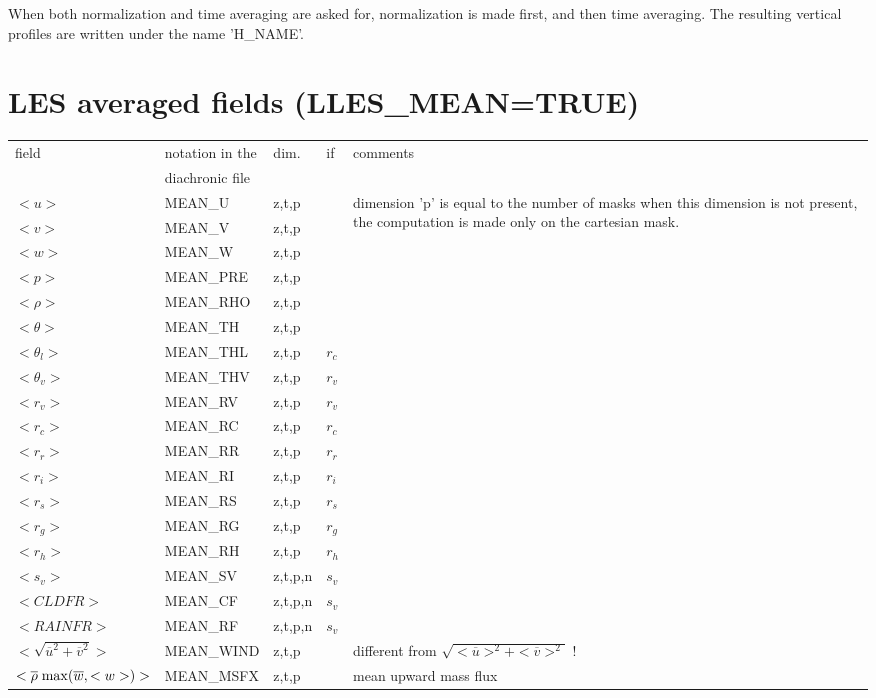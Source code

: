 When both normalization and time averaging are asked for,
normalization is made first, and then time averaging. The resulting
vertical profiles are written under the name 'H\_NAME'.\\

\section{LES averaged fields (LLES\_MEAN=TRUE)}


\begin{center}
\begin{makeimage}
\begin{tabular}{||p{6cm}|>{\centering}p{2.5cm}|>{\centering}p{1.5cm}|>{\centering}p{0.5cm}|p{5cm }||}
\hline
\hline
field & notation in the & dim. &   if  & comments \\
      & diachronic file & &  & \\
\hline
\hline
$<u>$ & MEAN\_U & z,t,p & &\multirow{15}{5cm}{dimension 'p' is equal to the  number of masks when this dimension is not present, the computation is made only on the cartesian mask.}\\
\cline{1-4}
$<v>$ & MEAN\_V &z,t,p &   &  \\
\cline{1-4}
$<w>$  & MEAN\_W &z,t,p &   & \\
\cline{1-4}
$<p>$   & MEAN\_PRE &z,t,p &   & \\
\cline{1-4}
$<\rho>$   & MEAN\_RHO &z,t,p &   & \\
\cline{1-4}
$<\theta>$   & MEAN\_TH &z,t,p &   &\\
\cline{1-4}
$<\theta_l>$   & MEAN\_THL &z,t,p &  $r_c$  &\\
\cline{1-4}
$<\theta_v>$   & MEAN\_THV &z,t,p &  $r_v$  &\\
\cline{1-4}
$<r_v>$   & MEAN\_RV &z,t,p &  $r_v$  &\\
\cline{1-4}
$<r_c>$   & MEAN\_RC &z,t,p &  $r_c$  &\\
\cline{1-4}
$<r_r>$   & MEAN\_RR &z,t,p &  $r_r$  &\\
\cline{1-4}
$<r_i>$   & MEAN\_RI &z,t,p &  $r_i$  &\\
\cline{1-4}
$<r_s>$   & MEAN\_RS &z,t,p &  $r_s$  &\\
\cline{1-4}
$<r_g>$   & MEAN\_RG &z,t,p &  $r_g$  &\\
\cline{1-4}
$<r_h>$   & MEAN\_RH &z,t,p &  $r_h$  &\\
\cline{1-4}
$<s_v>$   & MEAN\_SV &z,t,p,n &  $s_v$  &\\
\cline{1-4}
$<CLDFR>$   & MEAN\_CF &z,t,p,n &  $s_v$  &\\
\cline{1-4}
$<RAINFR>$   & MEAN\_RF &z,t,p,n &  $s_v$  &\\
\hline
$<\sqrt{\overline{u}^2+\overline{v}^2}>$   & MEAN\_WIND &z,t,p &   & different from $\sqrt{<\overline{u}>^2+<\overline{v}>^2}$ !\\
\hline
$<\overline{\rho} \;{\rm max}(\overline{w},<w>) >$  & MEAN\_MSFX &z,t,p &   & mean upward mass flux\\
\hline
\hline
\end{tabular}
\end{makeimage}
\end{center}

